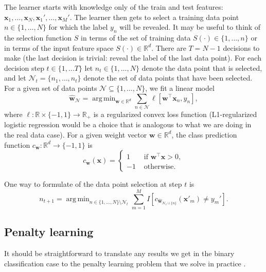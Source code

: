 \documentclass{article}
\newcommand{\RR}{\mathbb R}
\DeclareMathOperator*{\argmin}{arg\,min}
\begin{document}
The learner starts with knowledge only of the train and test features:
$\mathbf x_1, \dots, \mathbf x_N, \mathbf x_1', \dots, \mathbf
x_M'$. The learner then gets to select a training data point $n\in\{1,
\dots, N\}$ for which the label $y_n$ will be revealed. It may be
useful to think of the selection function $S$ in terms of the set of
training data $S(\cdot)\in\{1,\dots, n\}$ or in terms of the input
feature space $S(\cdot)\in\RR^d$. There are $T= N-1$ decisions to make
(the last decision is trivial: reveal the label of the last data
point). For each decision step $t\in\{1, \dots T\}$ let
$n_t\in\{1,\dots, N\}$ denote the data point that is selected, and let
$\mathcal N_t=\{n_1, \dots, n_t\}$ denote the set of data points that
have been selected. For a given set of data points $\mathcal
N\subseteq \{1, \dots, N\}$, we fit a linear model
\begin{equation}
  \label{eq:argmin_w}
  \mathbf{\hat w}_{\mathcal N} = 
  \argmin_{\mathbf w \in \RR^d} 
  \sum_{n\in\mathcal N} \ell\left[
    \mathbf w^\intercal \mathbf x_n, y_n
  \right],
\end{equation}
where $\ell:\RR \times \{-1, 1\}\rightarrow \RR_+$ is a regularized
convex loss function (L1-regularized logistic regression would be a
choice that is analogous to what we are doing in the real data case).
For a given weight vector $\mathbf w\in\RR^d$, the class prediction
function $c_{\mathbf w}:\RR^d\rightarrow\{-1, 1\}$ is
\begin{equation}
  \label{eq:c_w}
  c_{\mathbf w}(\mathbf x) =
  \begin{cases}
    1 & \text{ if } \mathbf w^\intercal \mathbf x > 0, \\
    -1 & \text{ otherwise.}
  \end{cases}
\end{equation}

One way to formulate of the data point selection at step $t$ is 
\begin{equation}
  \label{eq:argmin_n_t}
  n_{t+1} =
  \argmin_{n\in\{1,\dots,N\} \setminus \mathcal N_t}
  \sum_{m=1}^M
  I\left[
    c_{\mathbf{\hat w}_{\mathcal N_t \cup \{n\}}}(\mathbf x'_m) \neq y_m'
  \right].
\end{equation}

\subsection{Penalty learning}

It should be straightforward to translate any results we get in the
binary classification case to the penalty learning problem that we
solve in practice \citep{HOCKING-penalties}.




\end{document}
